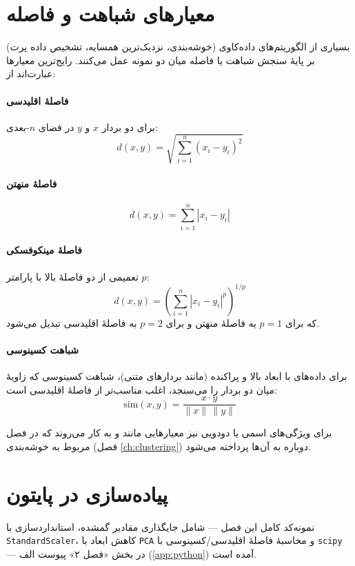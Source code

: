 \section{معیارهای شباهت و فاصله}
\label{sec:similarity}

بسیاری از الگوریتم‌های داده‌کاوی (خوشه‌بندی، نزدیک‌ترین همسایه، تشخیص داده پرت)
بر پایهٔ سنجش شباهت یا فاصله میان دو نمونه عمل می‌کنند. رایج‌ترین معیارها
عبارت‌اند از:

\paragraph{فاصلهٔ اقلیدسی}
برای دو بردار $x$ و $y$ در فضای $n$-بعدی:
\[
d(x, y) = \sqrt{\sum_{i=1}^{n} (x_i - y_i)^2}
\]

\paragraph{فاصلهٔ منهتن}
\[
d(x, y) = \sum_{i=1}^{n} |x_i - y_i|
\]

\paragraph{فاصلهٔ مینکوفسکی}
تعمیمی از دو فاصلهٔ بالا با پارامتر $p$:
\[
d(x, y) = \left( \sum_{i=1}^{n} |x_i - y_i|^p \right)^{1/p}
\]
که برای $p=1$ به فاصلهٔ منهتن و برای $p=2$ به فاصلهٔ اقلیدسی تبدیل می‌شود.

\paragraph{شباهت کسینوسی}
برای داده‌های با ابعاد بالا و پراکنده (مانند بردارهای متنی)، شباهت کسینوسی
که زاویهٔ میان دو بردار را می‌سنجد، اغلب مناسب‌تر از فاصلهٔ اقلیدسی است:
\[
\text{sim}(x, y) = \frac{x \cdot y}{\|x\| \, \|y\|}
\]

برای ویژگی‌های اسمی یا دودویی نیز معیارهایی مانند
 و
 به کار می‌روند که در فصل
مربوط به خوشه‌بندی (فصل \ref{ch:clustering}) دوباره به آن‌ها پرداخته می‌شود.

\section*{پیاده‌سازی در پایتون}

نمونه‌کد کامل این فصل — شامل جایگذاری مقادیر گمشده، استانداردسازی با
\texttt{StandardScaler}، کاهش ابعاد با \texttt{PCA} و محاسبهٔ فاصلهٔ
اقلیدسی/کسینوسی با \texttt{scipy} — در بخش «فصل ۲» پیوست الف
(\ref{app:python}) آمده است.

